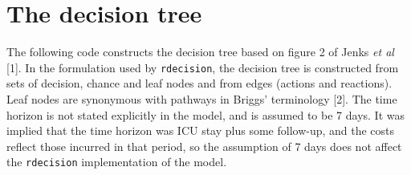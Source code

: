 \documentclass[
]{article}
\newenvironment{Shaded}{\begin{snugshade}}{\end{snugshade}}
\newcommand{\DecValTok}[1]{\textcolor[rgb]{0.00,0.00,0.81}{#1}}
\newcommand{\FunctionTok}[1]{\textcolor[rgb]{0.00,0.00,0.00}{#1}}
\newcommand{\NormalTok}[1]{#1}
\newcommand{\OtherTok}[1]{\textcolor[rgb]{0.56,0.35,0.01}{#1}}
\newcommand{\SpecialCharTok}[1]{\textcolor[rgb]{0.00,0.00,0.00}{#1}}
\newcommand{\StringTok}[1]{\textcolor[rgb]{0.31,0.60,0.02}{#1}}
\begin{document}
\begin{Shaded}
\end{Shaded}

\hypertarget{the-decision-tree}{%
\section{The decision tree}\label{the-decision-tree}}

The following code constructs the decision tree based on figure 2 of
Jenks \emph{et al} {[}1{]}. In the formulation used by
\texttt{rdecision}, the decision tree is constructed from sets of
decision, chance and leaf nodes and from edges (actions and reactions).
Leaf nodes are synonymous with pathways in Briggs' terminology {[}2{]}.
The time horizon is not stated explicitly in the model, and is assumed
to be 7 days. It was implied that the time horizon was ICU stay plus
some follow-up, and the costs reflect those incurred in that period, so
the assumption of 7 days does not affect the \texttt{rdecision}
implementation of the model.
\end{document}
